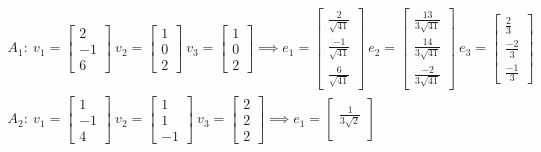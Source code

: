 \begin{gather*}
    A_1:~
    v_1 = \begin{bmatrix}
        2\\
        -1\\
        6 
    \end{bmatrix}
    ~ v_2 = \begin{bmatrix}
        1 \\
        0\\
        2  
    \end{bmatrix}
    ~ v_3 = \begin{bmatrix}
        1\\
        0\\
        2  
    \end{bmatrix}
    \implies
    e_1 = \begin{bmatrix}
        \frac{2}{\sqrt{41}}\\
        \frac{-1}{\sqrt{41}}\\
        \frac{6}{\sqrt{41}} 
    \end{bmatrix}
    ~ e_2 = \begin{bmatrix}
        \frac{13}{3\sqrt{41}}\\
        \frac{14}{3\sqrt{41}}\\
        \frac{-2}{3\sqrt{41}} 
    \end{bmatrix}
    ~ e_3 = \begin{bmatrix}
        \frac{2}{3}\\
        \frac{-2}{3}\\
        \frac{-1}{3} 
    \end{bmatrix}
    \\
    A_2:~
    v_1 = \begin{bmatrix}
        1\\
        -1\\
        4 
    \end{bmatrix}
    ~ v_2 = \begin{bmatrix}
        1\\
        1\\
        -1  
    \end{bmatrix}
    ~ v_3 = \begin{bmatrix}
        2\\
        2\\
        2  
    \end{bmatrix}
    \implies
    e_1 = \begin{bmatrix}
        \frac{1}{3\sqrt{2}}\\

\end{bmatrix}
\end{gather*}
